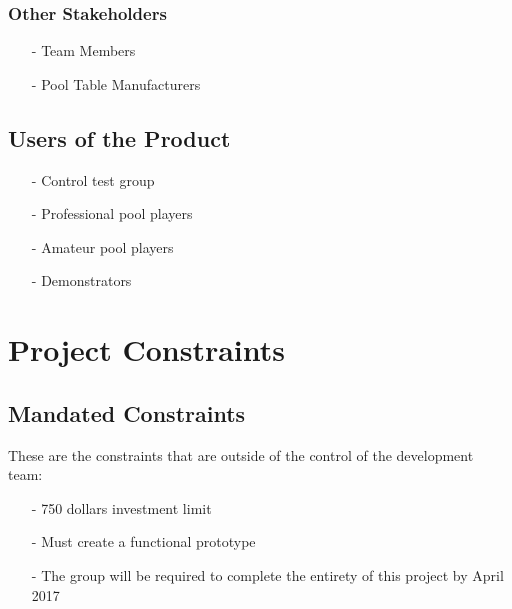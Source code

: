 \documentclass[titlepage]{article}
\begin{document}
\subsubsection{Other Stakeholders}
\begin{itemize}
	\item[-] Team Members
	\item[-] Pool Table Manufacturers
\end{itemize}

\subsection{Users of the Product}
\begin{itemize}
	\item[-] Control test group
	\item[-] Professional pool players
	\item[-] Amateur pool players
	\item[-] Demonstrators
\end{itemize}


\section{Project Constraints}
\subsection{Mandated Constraints}
These are the constraints that are outside of the control of the development team:
\begin{itemize}
	\item[-] 750 dollars investment limit
	\item[-] Must create a functional prototype
	\item[-] The group will be required to complete the entirety of this project by April 2017
\end{itemize}
\end{document}
